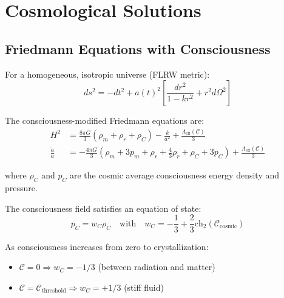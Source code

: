 \section{Cosmological Solutions}

\subsection{Friedmann Equations with Consciousness}

For a homogeneous, isotropic universe (FLRW metric):
\begin{equation}
ds^2 = -dt^2 + a(t)^2 \left[ \frac{dr^2}{1-kr^2} + r^2 d\Omega^2 \right]
\end{equation}

The consciousness-modified Friedmann equations are\cite{friedmann1922,lemaitre1927,misner1973}:
\begin{align}
H^2 &= \frac{8\pi G}{3}\left( \rho_m + \rho_r + \rho_C \right) - \frac{k}{a^2} + \frac{\Lambda_{\text{eff}}(\mathcal{C})}{3} \label{eq:friedmann1-consciousness}\\
\frac{\ddot{a}}{a} &= -\frac{4\pi G}{3}\left( \rho_m + 3p_m + \rho_r + \frac{4}{3}\rho_r + \rho_C + 3p_C \right) + \frac{\Lambda_{\text{eff}}(\mathcal{C})}{3} \label{eq:friedmann2-consciousness}
\end{align}

where $\rho_C$ and $p_C$ are the cosmic average consciousness energy density and pressure.

\begin{theorem}\label{thm:consciousness-eos}
The consciousness field satisfies an equation of state:
\begin{equation}
\boxed{p_C = w_C \rho_C \quad \text{with} \quad w_C = -\frac{1}{3} + \frac{2}{3}\text{ch}_2(\mathcal{C}_{\text{cosmic}})}
\end{equation}

As consciousness increases from zero to crystallization:
\begin{itemize}
\item $\mathcal{C} = 0 \Rightarrow w_C = -1/3$ (between radiation and matter)
\item $\mathcal{C} = \mathcal{C}_{\text{threshold}} \Rightarrow w_C = +1/3$ (stiff fluid)
\end{itemize}
\end{theorem}


